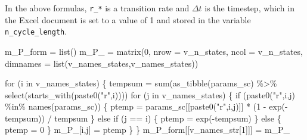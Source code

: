 \documentclass[
  letterpaper,
  DIV=11,
  numbers=noendperiod,
  oneside]{scrartcl}
\newenvironment{Shaded}{\begin{snugshade}}{\end{snugshade}}
\newcommand{\AttributeTok}[1]{\textcolor[rgb]{0.40,0.45,0.13}{#1}}
\newcommand{\ControlFlowTok}[1]{\textcolor[rgb]{0.00,0.23,0.31}{#1}}
\newcommand{\DecValTok}[1]{\textcolor[rgb]{0.68,0.00,0.00}{#1}}
\newcommand{\FunctionTok}[1]{\textcolor[rgb]{0.28,0.35,0.67}{#1}}
\newcommand{\NormalTok}[1]{\textcolor[rgb]{0.00,0.23,0.31}{#1}}
\newcommand{\OtherTok}[1]{\textcolor[rgb]{0.00,0.23,0.31}{#1}}
\newcommand{\SpecialCharTok}[1]{\textcolor[rgb]{0.37,0.37,0.37}{#1}}
\newcommand{\StringTok}[1]{\textcolor[rgb]{0.13,0.47,0.30}{#1}}
\begin{document}
In the above formulas, \texttt{r\_*} is a transition rate and
\(\Delta t\) is the timestep, which in the Excel document is set to a
value of 1 and stored in the variable \texttt{n\_cycle\_length}.

\begin{Shaded}
\begin{Highlighting}[]
\NormalTok{m\_P\_form }\OtherTok{=} \FunctionTok{list}\NormalTok{()}
\NormalTok{m\_P\_ }\OtherTok{=} \FunctionTok{matrix}\NormalTok{(}\DecValTok{0}\NormalTok{, }\AttributeTok{nrow =}\NormalTok{ v\_n\_states, }\AttributeTok{ncol =}\NormalTok{ v\_n\_states, }\AttributeTok{dimnames =} \FunctionTok{list}\NormalTok{(v\_names\_states,v\_names\_states))}

\ControlFlowTok{for}\NormalTok{ (i }\ControlFlowTok{in}\NormalTok{ v\_names\_states) \{}
\NormalTok{  tempsum }\OtherTok{=} \FunctionTok{sum}\NormalTok{(}\FunctionTok{as\_tibble}\NormalTok{(params\_sc) }\SpecialCharTok{\%\textgreater{}\%} \FunctionTok{select}\NormalTok{(}\FunctionTok{starts\_with}\NormalTok{(}\FunctionTok{paste0}\NormalTok{(}\StringTok{"r"}\NormalTok{,i))))}
  \ControlFlowTok{for}\NormalTok{ (j }\ControlFlowTok{in}\NormalTok{ v\_names\_states) \{}
    \ControlFlowTok{if}\NormalTok{ (}\FunctionTok{paste0}\NormalTok{(}\StringTok{"r"}\NormalTok{,i,j) }\SpecialCharTok{\%in\%} \FunctionTok{names}\NormalTok{(params\_sc)) \{}
\NormalTok{      ptemp }\OtherTok{=}\NormalTok{ params\_sc[[}\FunctionTok{paste0}\NormalTok{(}\StringTok{"r"}\NormalTok{,i,j)]] }\SpecialCharTok{*}\NormalTok{ (}\DecValTok{1} \SpecialCharTok{{-}} \FunctionTok{exp}\NormalTok{(}\SpecialCharTok{{-}}\NormalTok{tempsum)) }\SpecialCharTok{/}\NormalTok{ tempsum}
\NormalTok{    \} }\ControlFlowTok{else} \ControlFlowTok{if}\NormalTok{ (j }\SpecialCharTok{==}\NormalTok{ i) \{}
\NormalTok{      ptemp }\OtherTok{=} \FunctionTok{exp}\NormalTok{(}\SpecialCharTok{{-}}\NormalTok{tempsum)}
\NormalTok{    \} }\ControlFlowTok{else}\NormalTok{ \{}
\NormalTok{      ptemp }\OtherTok{=} \DecValTok{0}
\NormalTok{    \}}
\NormalTok{    m\_P\_[i,j] }\OtherTok{=}\NormalTok{ ptemp}
\NormalTok{  \}}
\NormalTok{\}}
\NormalTok{m\_P\_form[[v\_names\_str[}\DecValTok{1}\NormalTok{]]] }\OtherTok{=}\NormalTok{ m\_P\_}


\end{Highlighting}
\end{Shaded}
\end{document}

